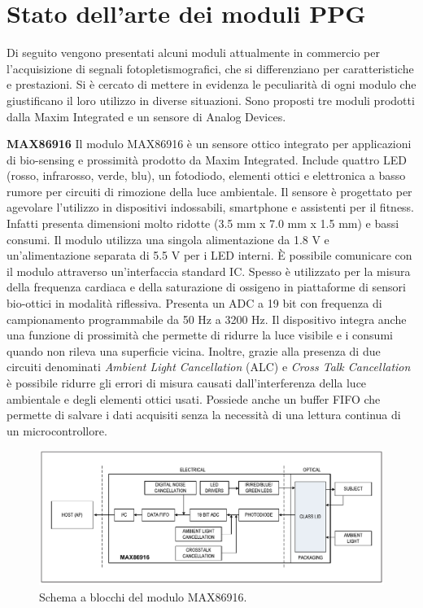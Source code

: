 \section{Stato dell'arte dei moduli PPG}
Di seguito vengono presentati alcuni moduli attualmente in commercio per l'acquisizione di segnali fotopletismografici, che si differenziano per caratteristiche e prestazioni. Si è cercato di mettere in evidenza le peculiarità di ogni modulo che giustificano il loro utilizzo in diverse situazioni. Sono proposti tre moduli prodotti dalla Maxim Integrated e un sensore di Analog Devices.

\textbf{MAX86916} Il modulo MAX86916 è un sensore ottico integrato per applicazioni di bio-sensing e prossimità prodotto da Maxim Integrated\cite{IntegratedMAX86916}. Include quattro LED (rosso, infrarosso, verde, blu), un fotodiodo, elementi ottici e elettronica a basso rumore per circuiti di rimozione della luce ambientale. Il sensore è progettato per agevolare l'utilizzo in dispositivi indossabili, smartphone e assistenti per il fitness. Infatti presenta dimensioni molto ridotte (3.5 mm x 7.0 mm x 1.5 mm) e bassi consumi. Il modulo utilizza una singola alimentazione da 1.8 V e un'alimentazione separata di 5.5 V per i LED interni. \`E possibile comunicare con il modulo attraverso un'interfaccia standard IC. Spesso è utilizzato per la misura della frequenza cardiaca e della saturazione di ossigeno in piattaforme di sensori bio-ottici in modalità riflessiva. Presenta un ADC a 19 bit con frequenza di campionamento programmabile da 50 Hz a 3200 Hz. Il dispositivo integra anche una funzione di prossimità che permette di ridurre la luce visibile e i consumi quando non rileva una superficie vicina. Inoltre, grazie alla presenza di due circuiti denominati \textit{Ambient Light Cancellation} (ALC) e \textit{Cross Talk Cancellation} è possibile ridurre gli errori di misura causati dall'interferenza della luce ambientale e degli elementi ottici usati. Possiede anche un buffer FIFO che permette di salvare i dati acquisiti senza la necessità di una lettura continua di un microcontrollore.
\begin{figure}[h]
	\centering
	\includegraphics[width=1\linewidth]{ImageFiles/Fotopletismografia/MAX86916BlockDiagram}
	\caption{Schema a blocchi del modulo MAX86916.}
	\label{fig:MAX86916BlockDiagram}
\end{figure}

